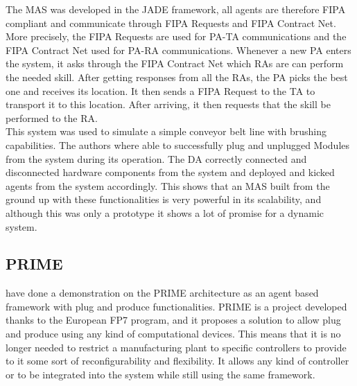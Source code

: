 The \gls{MAS} was developed in the JADE framework, all agents are therefore \gls{FIPA} compliant and communicate through \gls{FIPA} Requests and \gls{FIPA} Contract Net. More precisely, the \gls{FIPA} Requests are used for \gls{PA}-\gls{TA} communications and the \gls{FIPA} Contract Net used for \gls{PA}-\gls{RA} communications. Whenever a new \gls{PA} enters the system, it asks through the \gls{FIPA} Contract Net which \gls{RA}s are can perform the needed skill. After getting responses from all the \gls{RA}s, the \gls{PA} picks the best one and receives its location. It then sends a \gls{FIPA} Request to the \gls{TA} to transport it to this location. After arriving, it then requests that the skill be performed to the \gls{RA}.\\

This system was used to simulate a simple conveyor belt line with brushing capabilities. The authors where able to successfully plug and unplugged Modules from the system during its operation. The \gls{DA} correctly connected and disconnected hardware components from the system and deployed and kicked agents from the system accordingly. This shows that an \gls{MAS} built from the ground up with these functionalities is very powerful in its scalability, and although this was only a prototype it shows a lot of promise for a dynamic system.

\subsection{PRIME}

\citeauthor{PRIME_plug_and_produce} \cite{PRIME_plug_and_produce} have done a demonstration on the PRIME architecture as an agent based framework with plug and produce functionalities. PRIME is a project developed thanks to the European FP7 program, and it proposes a solution to allow plug and produce using any kind of computational devices. This means that it is no longer needed to restrict a manufacturing plant to specific controllers to provide to it some sort of reconfigurability and flexibility. It allows any kind of controller or to be integrated into the system while still using the same framework.\\

